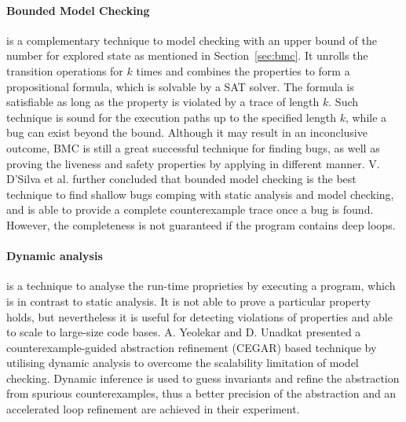 \paragraph{Bounded Model Checking} is a complementary technique to model checking with an upper bound of the number for explored state as mentioned in Section~\ref{sec:bmc}. It unrolls the transition operations for $k$ times and combines the properties to form a propositional formula, which is solvable by a SAT solver. The formula is satisfiable as long as the property is violated by a trace of length $k$. Such technique is sound for the execution paths up to the specified length $k$, while a bug can exist beyond the bound. Although it may result in an inconclusive outcome, BMC is still a great successful technique for finding bugs, as well as proving the liveness and safety properties by applying in different manner. V. D'Silva et al. \cite{4544862} further concluded that bounded model checking is the best technique to find shallow bugs comping with static analysis and model checking, and is able to provide a complete counterexample trace once a bug is found. However, the completeness is not guaranteed if the program contains deep loops.

\paragraph{Dynamic analysis} is a technique to analyse the run-time proprieties by executing a program, which is in contrast to static analysis. It is not able to prove a particular property holds, but nevertheless it is useful for detecting violations of properties \cite{Ball:1999:CDA:318774.318944} and able to scale to large-size code bases. A. Yeolekar and D. Unadkat \cite{Yeolekar2013} presented a counterexample-guided abstraction refinement (CEGAR) based technique by utilising dynamic analysis to overcome the scalability limitation of model checking. Dynamic inference is used to guess invariants and refine the abstraction from spurious counterexamples, thus a better precision of the abstraction and an accelerated loop refinement are achieved in their experiment.


